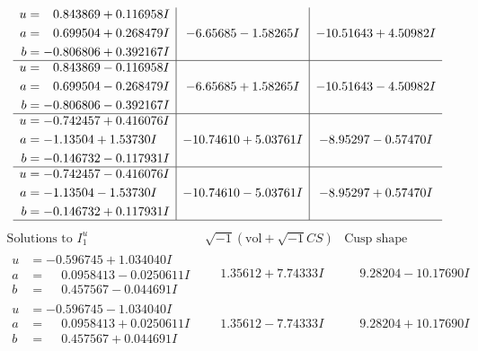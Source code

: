 \documentclass[1p]{elsarticle_modified}
\theoremstyle{definition}
\newcommand{\I}{\sqrt{-1}}
\begin{document}
$$\begin{array}{c|c|c}
\begin{aligned}
u &= \phantom{-}0.843869 + 0.116958 I \\
a &= \phantom{-}0.699504 + 0.268479 I \\
b &= -0.806806 + 0.392167 I\end{aligned}
 & -6.65685 - 1.58265 I & -10.51643 + 4.50982 I \\ \hline\begin{aligned}
u &= \phantom{-}0.843869 - 0.116958 I \\
a &= \phantom{-}0.699504 - 0.268479 I \\
b &= -0.806806 - 0.392167 I\end{aligned}
 & -6.65685 + 1.58265 I & -10.51643 - 4.50982 I \\ \hline\begin{aligned}
u &= -0.742457 + 0.416076 I \\
a &= -1.13504 + 1.53730 I \\
b &= -0.146732 - 0.117931 I\end{aligned}
 & -10.74610 + 5.03761 I & -8.95297 - 0.57470 I \\ \hline\begin{aligned}
u &= -0.742457 - 0.416076 I \\
a &= -1.13504 - 1.53730 I \\
b &= -0.146732 + 0.117931 I\end{aligned}
 & -10.74610 - 5.03761 I & -8.95297 + 0.57470 I\\
 \hline 
 \end{array}$$\newpage$$\begin{array}{c|c|c}  
\text{Solutions to }I^u_{1}& \I (\text{vol} + \sqrt{-1}CS) & \text{Cusp shape}\\
 \hline 
\begin{aligned}
u &= -0.596745 + 1.034040 I \\
a &= \phantom{-}0.0958413 - 0.0250611 I \\
b &= \phantom{-}0.457567 - 0.044691 I\end{aligned}
 & \phantom{-}1.35612 + 7.74333 I & \phantom{-}9.28204 - 10.17690 I \\ \hline\begin{aligned}
u &= -0.596745 - 1.034040 I \\
a &= \phantom{-}0.0958413 + 0.0250611 I \\
b &= \phantom{-}0.457567 + 0.044691 I\end{aligned}
 & \phantom{-}1.35612 - 7.74333 I & \phantom{-}9.28204 + 10.17690 I \\ \hline\begin{aligned}

\end{aligned}
\end{array}$$
\end{document}
